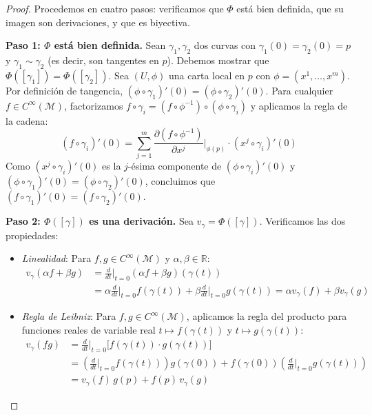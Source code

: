 \begin{proof}
Procedemos en cuatro pasos: verificamos que $\Phi$ está bien definida, que su imagen son derivaciones, y que es biyectiva.

\textbf{Paso 1: $\Phi$ está bien definida.} Sean $\gamma_1, \gamma_2$ dos curvas con $\gamma_1(0) = \gamma_2(0) = p$ y $\gamma_1 \sim \gamma_2$ (es decir, son tangentes en $p$). Debemos mostrar que $\Phi([\gamma_1]) = \Phi([\gamma_2])$. Sea $(U, \phi)$ una carta local en $p$ con $\phi = (x^1, \ldots, x^m)$. Por definición de tangencia, $(\phi \circ \gamma_1)'(0) = (\phi \circ \gamma_2)'(0)$. Para cualquier $f \in C^\infty(\mathcal{M})$, factorizamos $f \circ \gamma_i = (f \circ \phi^{-1}) \circ (\phi \circ \gamma_i)$ y aplicamos la regla de la cadena:
\[
(f \circ \gamma_i)'(0) = \sum_{j=1}^{m} \frac{\partial (f \circ \phi^{-1})}{\partial x^j}\bigg|_{\phi(p)} \cdot (x^j \circ \gamma_i)'(0)
\]
Como $(x^j \circ \gamma_i)'(0)$ es la $j$-ésima componente de $(\phi \circ \gamma_i)'(0)$ y $(\phi \circ \gamma_1)'(0) = (\phi \circ \gamma_2)'(0)$, concluimos que $(f \circ \gamma_1)'(0) = (f \circ \gamma_2)'(0)$.

\textbf{Paso 2: $\Phi([\gamma])$ es una derivación.} Sea $v_\gamma = \Phi([\gamma])$. Verificamos las dos propiedades:
\begin{itemize}
    \item \textit{Linealidad}: Para $f, g \in C^\infty(\mathcal{M})$ y $\alpha, \beta \in \mathbb{R}$:
    \begin{align*}
    v_\gamma(\alpha f + \beta g) &= \frac{d}{dt}\bigg|_{t=0} (\alpha f + \beta g)(\gamma(t)) \\
    &= \alpha \frac{d}{dt}\bigg|_{t=0} f(\gamma(t)) + \beta \frac{d}{dt}\bigg|_{t=0} g(\gamma(t)) = \alpha v_\gamma(f) + \beta v_\gamma(g)
    \end{align*}
    \item \textit{Regla de Leibniz}: Para $f, g \in C^\infty(\mathcal{M})$, aplicamos la regla del producto para funciones reales de variable real $t \mapsto f(\gamma(t))$ y $t \mapsto g(\gamma(t))$:
    \begin{align*}
    v_\gamma(fg) &= \frac{d}{dt}\bigg|_{t=0} \bigl[f(\gamma(t)) \cdot g(\gamma(t))\bigr] \\
    &= \left(\frac{d}{dt}\bigg|_{t=0} f(\gamma(t))\right) g(\gamma(0)) + f(\gamma(0)) \left(\frac{d}{dt}\bigg|_{t=0} g(\gamma(t))\right) \\
    &= v_\gamma(f) \, g(p) + f(p) \, v_\gamma(g)
    \end{align*}
\end{itemize}


\end{proof}
